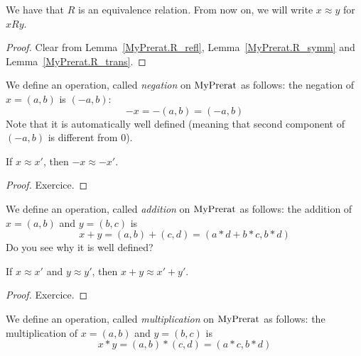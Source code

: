 \begin{lemma}
    \label{MyPrerat.R_equiv}
    \leanok
We have that $R$ is an equivalence relation. From now on, we will write $x \approx y$ for
$x R y$.
\end{lemma}
\begin{proof}
    \leanok
Clear from Lemma~\ref{MyPrerat.R_refl}, Lemma~\ref{MyPrerat.R_symm} and Lemma~\ref{MyPrerat.R_trans}.
\end{proof}

\begin{definition}
    \label{MyPrerat.neg}
    \leanok
We define an operation, called \emph{negation} on $\mathrm{MyPrerat}$ as follows: the negation of $x = (a,b)$ is
$(-a,b)$:
\[
-x = -(a,b) = (-a,b)
\]
Note that it is automatically well defined (meaning that second component of $(-a,b)$ is different from $0$).
\end{definition}

\begin{lemma}
    \label{MyPrerat.neg_quotient}
    \leanok
If $x \approx x'$, then $-x \approx -x'$.
\end{lemma}
\begin{proof}
\leanok
Exercice.
\end{proof}

\begin{definition}
    \label{MyPrerat.add}
    \leanok
We define an operation, called \emph{addition} on $\mathrm{MyPrerat}$ as follows: the addition of $x = (a,b)$
and $y = (b, c)$ is
\[
x + y = (a,b) + (c,d) = (a * d + b * c, b*d)
\]
Do you see why it is well defined?
\end{definition}

\begin{lemma}
    \label{MyPrerat.add_quotient}
    \leanok
If $x \approx x'$ and $y \approx y'$, then $x + y \approx x' + y'$.
\end{lemma}
\begin{proof}
\leanok
Exercice.
\end{proof}

\begin{definition}
    \label{MyPrerat.mul}
    \leanok
We define an operation, called \emph{multiplication} on $\mathrm{MyPrerat}$ as follows: the multiplication of $x = (a,b)$ and $y = (b, c)$ is
\[
x * y = (a,b) * (c,d) = (a*c, b*d)
\]
\end{definition}

